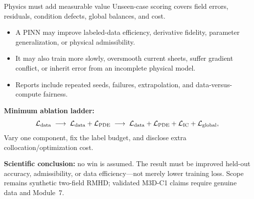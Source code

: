 \documentclass[aspectratio=169,11pt]{beamer}
\newcommand{\currentmodule}{Module 1}
\newcommand{\moduleprogress}{1 of 6}
\newcommand{\setmodule}[2]{%
  \renewcommand{\currentmodule}{#1}%
  \renewcommand{\moduleprogress}{#2}%
}
\begin{document}
\setmodule{Module 5}{5 of 5}
\begin{frame}{Physics must add measurable value}
Unseen-case scoring covers field errors, residuals, condition defects, global balances, and cost.

\begin{itemize}
  \item A PINN may improve labeled-data efficiency, derivative fidelity, parameter generalization, or physical admissibility.
  \item It may also train more slowly, oversmooth current sheets, suffer gradient conflict, or inherit error from an incomplete physical model.
  \item Reports include repeated seeds, failures, extrapolation, and data-versus-compute fairness.
\end{itemize}

\textbf{Minimum ablation ladder:}
\[
\mathcal L_{\rm data}
\;\longrightarrow\;
\mathcal L_{\rm data}+\mathcal L_{\rm PDE}
\;\longrightarrow\;
\mathcal L_{\rm data}+\mathcal L_{\rm PDE}
+\mathcal L_{\rm IC}+\mathcal L_{\rm global},
\]
Vary one component, fix the label budget, and disclose extra collocation/optimization cost.

\textcolor{WarningRed}{\textbf{Scientific conclusion:}} no win is assumed.  The result must be improved held-out accuracy, admissibility, or data efficiency---not merely lower training loss.  Scope remains synthetic two-field RMHD; validated M3D-C1 claims require genuine data and Module~7.
\end{frame}
\end{document}
